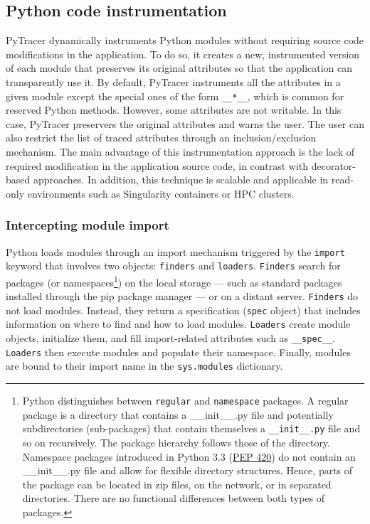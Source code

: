\documentclass[11pt]{article}
\newcommand{\tristan}[1]{\color{orange}\textbf{From Tristan:} #1\color{black}\xspace}
\newcommand{\gkmod}[2]{\color{purple}\sout{#1} #2\color{black}\xspace}
\newcommand{\Yohan}[1]{\color{green!75!black}\textbf{Yohan:} #1\color{black}\xspace}
\newcommand{\pytracer}[0]{PyTracer\xspace}
\begin{document}
\subsection{Python code instrumentation}



\pytracer dynamically instruments Python modules
without requiring source code modifications in the application.
To do so, it creates a new, instrumented version of each module that preserves its original attributes so that the application can transparently use it.
By default, \pytracer instruments all the attributes
in a given module except the special ones of the form \texttt{\_\_*\_\_}, which is common for reserved Python methods.
However, some attributes are not writable. In this case, \pytracer preservers the original attributes and warns the user. The user can also restrict the list of traced attributes through
an inclusion/exclusion mechanism. The main advantage of this instrumentation approach is the lack of required modification in the application source code, in contrast with decorator-based approaches. In addition, this technique is scalable and applicable in read-only environments such as Singularity containers or HPC clusters.





\subsubsection{Intercepting module import}

Python loads modules through an import mechanism triggered by the \texttt{import} keyword that involves two objects: \texttt{finders} and \texttt{loaders}. \texttt{Finders} search for packages (or 
namespaces\footnote{Python distinguishes between \texttt{regular} and \texttt{namespace} packages.
A regular package is a directory that contains a \_\_init\_\_.py file and potentially subdirectories (sub-packages) 
that contain themselves a \texttt{\_\_init\_\_.py} file and so on recursively. 
The package hierarchy follows those of the directory. 
Namespace packages introduced in Python 3.3 (\href{https://www.python.org/dev/peps/pep-0420/}{PEP 420}) do not contain an
\_\_init\_\_.py file and allow for flexible directory structures. Hence, parts of the package can be located in zip files, on the network, or in separated directories. There are no functional differences between both types of packages.}) on the local storage --- such as standard packages installed through the pip package manager --- or on a distant server.
\texttt{Finders} do not load modules. Instead, they return a specification (\texttt{spec} object) that includes 
information on where to find and how to load modules.
\texttt{Loaders} create module objects, initialize them, and fill import-related attributes 
such as \texttt{\_\_spec\_\_}. 
\texttt{Loaders} then execute modules and populate their namespace. Finally, modules are bound to their import name in the \texttt{sys.modules} dictionary.
\end{document}
